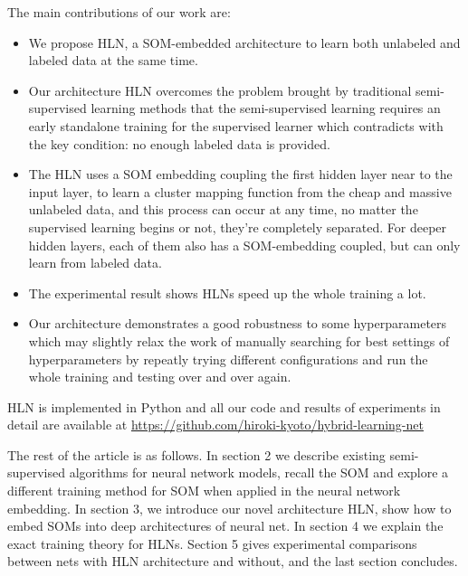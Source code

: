 \documentclass[3p,times,procedia]{elsarticle}
\begin{document}
The main contributions of our work are:
\begin{itemize}
\item We propose HLN, a SOM-embedded 
architecture to learn both unlabeled 
and labeled data at the same time.
\item Our architecture HLN overcomes
the problem brought by traditional 
semi-supervised learning methods that 
the semi-supervised learning requires
an early standalone training for the
supervised learner which contradicts
with the key condition: no enough 
labeled data is provided.
\item The HLN uses a SOM embedding 
coupling the first hidden layer near 
to the input layer, to learn a cluster 
mapping function from the cheap and 
massive unlabeled data, and this process
can occur at any time, no matter the 
supervised learning begins or not,
they're completely separated.
For deeper hidden layers, each of them 
also has a SOM-embedding coupled, 
but can only learn from labeled data.
\item The experimental result shows HLNs
speed up the whole training a lot.
\item Our architecture demonstrates a 
good robustness to some hyperparameters
which may slightly relax the work of 
manually searching for best settings
of hyperparameters by repeatly trying
different configurations and run the
whole training and testing over and 
over again.
\end{itemize}
HLN is implemented in Python and all
our code and results of experiments
in detail are available at
\url{https://github.com/hiroki-kyoto/hybrid-learning-net}

The rest of the article is as follows.
In section 2 we describe existing
semi-supervised algorithms for neural
network models, recall
the SOM and explore a different
training method for SOM when applied in
the neural network embedding.
In section 3, we introduce our novel
architecture HLN, show how to
embed SOMs into deep architectures of
neural net.
In section 4 we explain the exact 
training theory for HLNs.
Section 5 gives experimental
comparisons between nets with HLN
architecture and without, and the
last section concludes.
\end{document}
